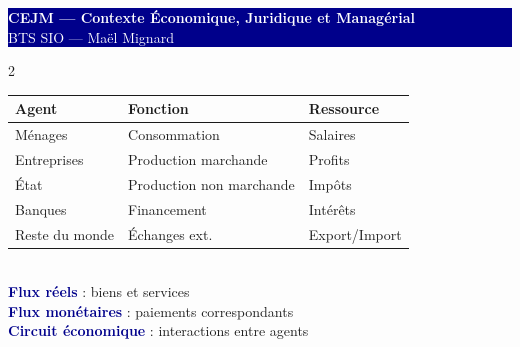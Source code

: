 \documentclass[a4paper,10pt]{article}
\newcommand{\key}[1]{\textbf{\textcolor{darkblue}{#1}}}
\begin{document}
\begin{center}
  \colorbox{darkblue}{\parbox{\dimexpr\textwidth-2\fboxsep}{
    \centering\vspace{3pt}
    {\LARGE\bfseries\textcolor{white}{CEJM — Contexte Économique, Juridique et Managérial}}\\
    {\normalsize\textcolor{white}{BTS SIO — Maël Mignard}}
    \vspace{3pt}
  }}
\end{center}
\vspace{6pt}

\begin{multicols}{2}

\begin{tcolorbox}[basebox, colframe=darkblue, title=1. ÉCONOMIE — Les agents économiques]
\begin{tabular}{lll}
\toprule
\textbf{Agent} & \textbf{Fonction} & \textbf{Ressource} \\
\midrule
Ménages & Consommation & Salaires \\
Entreprises & Production marchande & Profits \\
État & Production non marchande & Impôts \\
Banques & Financement & Intérêts \\
Reste du monde & Échanges ext. & Export/Import \\
\bottomrule
\end{tabular}
\vspace{4pt}\\
\key{Flux réels} : biens et services \\
\key{Flux monétaires} : paiements correspondants \\
\key{Circuit économique} : interactions entre agents
\end{tcolorbox}


\end{multicols}
\end{document}
